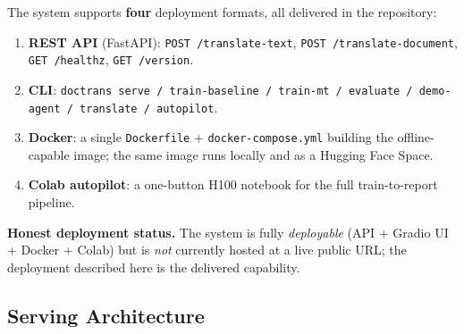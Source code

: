 \documentclass[12pt,a4paper]{article}
\begin{document}
The system supports \textbf{four} deployment formats, all delivered in the repository:
\begin{enumerate}
  \item \textbf{REST API} (FastAPI): \texttt{POST /translate-text}, \texttt{POST /translate-document}, \texttt{GET /healthz}, \texttt{GET /version}.
  \item \textbf{CLI}: \texttt{doctrans serve / train-baseline / train-mt / evaluate / demo-agent / translate / autopilot}.
  \item \textbf{Docker}: a single \texttt{Dockerfile} + \texttt{docker-compose.yml} building the offline-capable image; the same image runs locally and as a Hugging Face Space.
  \item \textbf{Colab autopilot}: a one-button H100 notebook for the full train-to-report pipeline.
\end{enumerate}

\textbf{Honest deployment status.} The system is fully \emph{deployable} (API + Gradio UI + Docker + Colab) but is \emph{not} currently hosted at a live public URL; the deployment described here is the delivered capability.

\subsection{Serving Architecture}
\end{document}
